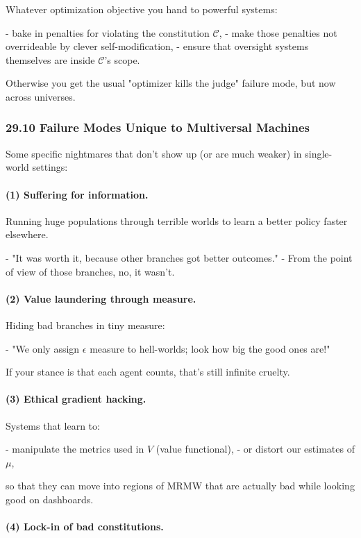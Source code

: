 Whatever optimization objective you hand to powerful systems:

- bake in penalties for violating the constitution $\mathcal{C}$,
- make those penalties not overrideable by clever self-modification,
- ensure that oversight systems themselves are inside $\mathcal{C}$’s scope.

Otherwise you get the usual "optimizer kills the judge" failure mode, but now across universes.

\subsubsection*{29.10  Failure Modes Unique to Multiversal Machines}

Some specific nightmares that don’t show up (or are much weaker) in single-world settings:

\paragraph{(1) Suffering for information.}

Running huge populations through terrible worlds to learn a better policy faster elsewhere.

- "It was worth it, because other branches got better outcomes."
- From the point of view of those branches, no, it wasn’t.

\paragraph{(2) Value laundering through measure.}

Hiding bad branches in tiny measure:

- "We only assign $\epsilon$ measure to hell-worlds; look how big the good ones are!"

If your stance is that each agent counts, that’s still infinite cruelty.

\paragraph{(3) Ethical gradient hacking.}

Systems that learn to:

- manipulate the metrics used in $V$ (value functional),
- or distort our estimates of $\mu$,

so that they can move into regions of MRMW that are actually bad while looking good on dashboards.

\paragraph{(4) Lock-in of bad constitutions.}

